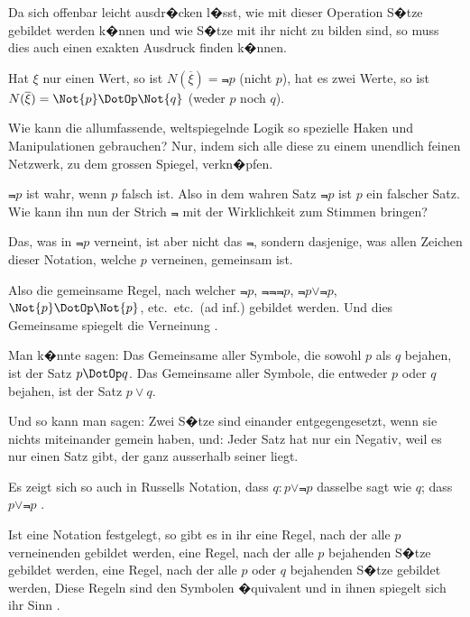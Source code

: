 {Da sich offenbar leicht ausdr�cken l�sst, wie mit
dieser Operation S�tze gebildet werden k�nnen und
wie S�tze mit ihr nicht zu bilden sind, so muss
dies auch einen exakten Ausdruck finden k�nnen.}


{Hat $\xi$ nur einen Wert, so ist $N(\overline{\xi}) = \Not{p}$ (nicht $p$),
hat es zwei Werte, so ist $N(\overline{\xi}) = \Not{p} \DotOp \Not{q}$ (weder
$p$ noch $q$).}


{Wie kann die allumfassende, weltspiegelnde
Logik so spezielle Haken und Manipulationen
gebrauchen? Nur, indem sich alle diese zu einem
unendlich feinen Netzwerk, zu dem grossen Spiegel,
verkn�pfen.}


{\glqq{}$\Not{p}$\grqq{} ist wahr, wenn \glqq{}$p$\grqq{} falsch ist. Also in
dem wahren Satz \glqq{}$\Not{p}$\grqq{} ist \glqq{}$p$\grqq{} ein falscher Satz.
Wie kann ihn nun der Strich \glqq{}$\Not{}$\grqq{} mit der Wirklichkeit
zum Stimmen bringen?

Das, was in \glqq{}$\Not{p}$\grqq{} verneint, ist aber nicht das
\glqq{}$\Not{}$\grqq{}, sondern dasjenige, was allen Zeichen dieser
Notation, welche $p$ verneinen, gemeinsam ist.

Also die gemeinsame Regel, nach welcher
\glqq{}$\Not{p}$\grqq{}, \glqq{}$\Not{\Not{\Not{p}}}$\grqq{}, \glqq{}$\Not{p} \lor \Not{p}$\grqq{}, \glqq{}$\Not{p} \DotOp \Not{p}$\grqq{}, etc.\ etc.\ (ad
inf.) gebildet werden. Und dies Gemeinsame
spiegelt die Verneinung .}


{Man k�nnte sagen: Das Gemeinsame aller Symbole,
die sowohl $p$ als $q$ bejahen, ist der Satz
\glqq{}$p \DotOp q$\grqq{}. Das Gemeinsame aller Symbole, die
entweder $p$ oder $q$ bejahen, ist der Satz \glqq{}$p \lor q$\grqq{}.

Und so kann man sagen: Zwei S�tze sind
einander entgegengesetzt, wenn sie nichts miteinander
gemein haben, und: Jeder Satz hat nur ein
Negativ, weil es nur einen Satz gibt, der ganz
ausserhalb seiner liegt.

Es zeigt sich so auch in Russells Notation, dass
\glqq{}$q : p \lor \Not{p}$\grqq{} dasselbe sagt wie \glqq{}$q$\grqq{}; dass \glqq{}$p \lor \Not{p}$\grqq{}
.}


{Ist eine Notation festgelegt, so gibt es in ihr eine
Regel, nach der alle $p$ verneinenden  gebildet
werden, eine Regel, nach der alle $p$ bejahenden
S�tze gebildet werden, eine Regel, nach der alle
$p$ oder $q$ bejahenden S�tze gebildet werden, \undSoFort{}
Diese Regeln sind den Symbolen �quivalent
und in ihnen spiegelt sich ihr Sinn .}


